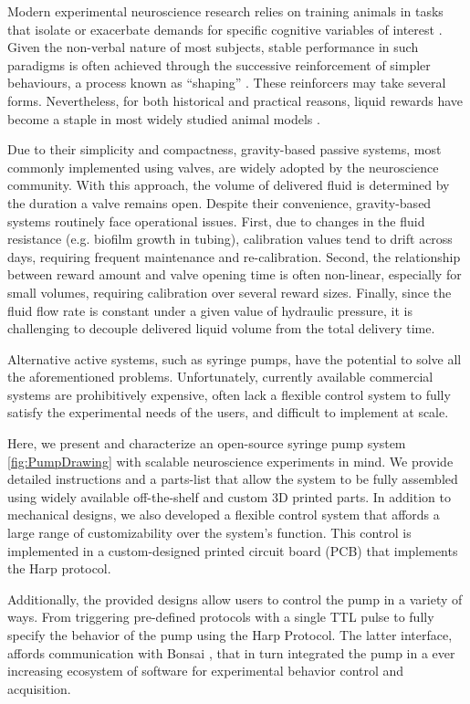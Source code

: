 Modern experimental neuroscience research relies on training animals in tasks that isolate or exacerbate demands for specific cognitive variables of interest \citep{Gomez-Marin2016}. Given the non-verbal nature of most subjects, stable performance in such paradigms is often achieved through the successive reinforcement of simpler behaviours, a process known as “shaping” \citep{Jones1939}. These reinforcers may take several forms. Nevertheless, for both historical and practical reasons, liquid rewards have become a staple in most widely studied animal models \citep{Guo2014}. 

Due to their simplicity and compactness, gravity-based passive systems, most commonly implemented using valves, are widely adopted by the neuroscience community. With this approach, the volume of delivered fluid is determined by the duration a valve remains open. Despite their convenience, gravity-based systems routinely face operational issues. First, due to changes in the fluid resistance (e.g. biofilm growth in tubing), calibration values tend to drift across days, requiring frequent maintenance and re-calibration. Second, the relationship between reward amount and valve opening time is often non-linear, especially for small volumes, requiring calibration over several reward sizes. Finally, since the fluid flow rate is constant under a given value of hydraulic pressure, it is challenging to decouple delivered liquid volume from the total delivery time.

Alternative active systems, such as syringe pumps, have the potential to solve all the aforementioned problems. Unfortunately, currently available commercial systems are prohibitively expensive, often lack a flexible control system to fully satisfy the experimental needs of the users, and difficult to implement at scale.

Here, we present and characterize an open-source syringe pump system \ref{fig:PumpDrawing} with scalable neuroscience experiments in mind. We provide detailed instructions and a parts-list that allow the system to be fully assembled using widely available off-the-shelf and custom 3D printed parts. 
In addition to mechanical designs, we also developed a flexible control system that affords a large range of customizability over the system's function. This control is implemented in a custom-designed printed circuit board (PCB) that implements the Harp protocol.

Additionally, the provided designs allow users to control the pump in a variety of ways. From triggering pre-defined protocols with a single TTL pulse to fully specify the behavior of the pump using the Harp Protocol. The latter interface, affords communication with Bonsai \citep{Lopes2015}, that in turn integrated the pump in a ever increasing ecosystem of software for experimental behavior control and acquisition.

